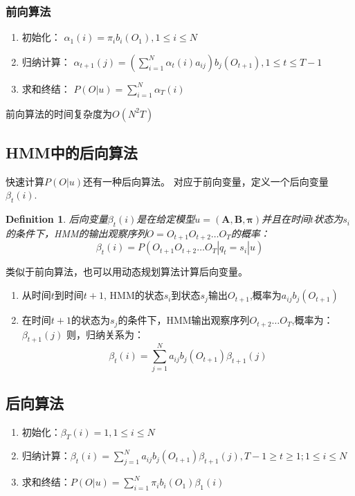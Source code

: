 \documentclass[a4paper,12pt]{book}
\newtheorem{definition}{Definition}
\begin{document}
    \subsubsection{前向算法}

    \begin{enumerate}
        \item 初始化： $\alpha_1(i)=\pi_ib_i(O_1), 1 \le i \le N$
        \item 归纳计算： $\alpha_{t+1}(j) = (\sum_{i=1}^{N}\alpha_t(i)a_{ij})b_j({O_{t+1}}) , 1 \le t \le T-1$
        \item 求和终结： $P(O|u) = \sum _{i=1}^{N}\alpha_T(i)$
    \end{enumerate}

    前向算法的时间复杂度为$O(N^2T)$

    \subsection{HMM中的后向算法}
    快速计算$P(O|u)$还有一种后向算法。
    对应于前向变量，定义一个后向变量$\beta_t(i)$.
    \begin{definition}
        后向变量$\beta_t(i)$是在给定模型$u = (\boldsymbol{A,B,\pi})$并且在时间$t$状态为$s_i$的条件下，HMM的输出观察序列$O=O_{t+1}O_{t+2}\dots O_T$的概率：
        \begin{equation}
            \beta_t(i) = P(O_{t+1}O_{t+2}\dots O_T| q_t=s_i|u)
        \end{equation}
    \end{definition} 
    
    类似于前向算法，也可以用动态规划算法计算后向变量。
    \begin{enumerate}
        \item 从时间$t$到时间$t+1$, HMM的状态$s_i$到状态$s_j$输出$O_{t+1}$,概率为$a_{ij}b_j(O_{t+1})$
        \item 在时间$t+1$的状态为$s_j$的条件下，HMM输出观察序列$O_{t+2}\dots O_T$,概率为：$\beta_{t+1}(j) $
        则，归纳关系为：
        \begin{equation}
            \beta_t(i)=\sum_{j=1}^{N}a_{ij}b_j(O_{t+1})\beta_{t+1}(j)
        \end{equation}
    \end{enumerate}
   

    \subsection{后向算法}
    \begin{enumerate}
        \item 初始化：$\beta_T(i)=1, 1 \le i \le N$
        \item 归纳计算：$\beta_t(i)=\sum_{j=1}^{N}a_{ij}b_j(O_{t+1})\beta_{t+1}(j), T-1 \ge t \ge 1; 1 \le i \le N$
        \item 求和终结：$P(O|u) = \sum _{i=1}^{N}\pi_ib_i(O_1)\beta_1(i)$
    \end{enumerate}
\end{document}
